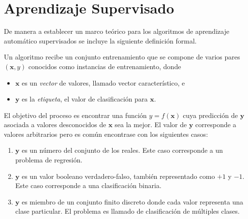 \section{Aprendizaje Supervisado}

\label{sec3:aprendizaje}De manera a establecer un marco teórico para los algoritmos de aprendizaje automático supervisados \cite{Rajaraman2011} se incluye la siguiente definición formal.

\begin{definition}\label{def3:clasificacion}Un algoritmo  recibe un conjunto entrenamiento que se compone de varios pares $(\boldsymbol{x},y)$ conocidos como instancias de entrenamiento, donde
\begin{itemize}
\item $\boldsymbol{x}$ es un \emph{vector} de valores, llamado vector característico, e
\item $\boldsymbol{y}$ es la \emph{etiqueta}, el valor de clasificación para $\boldsymbol{x}$.
\end{itemize}
El objetivo del proceso  es encontrar una función $y=f(\boldsymbol{x})$ cuya predicción de $\boldsymbol{y}$ asociada a valores desconocidos de $\boldsymbol{x}$ sea la mejor. El valor de $\boldsymbol{y}$ corresponde a valores arbitrarios pero es común encontrase con los siguientes casos:
\begin{enumerate}
\item $\boldsymbol{y}$ es un número del conjunto de los reales. Este caso corresponde a un problema de regresión.
\item $\boldsymbol{y}$ es un valor booleano verdadero-falso, también representado como $+1$ y $-1$. Este caso corresponde a una clasificación binaria. 
\item $\boldsymbol{y}$ es miembro de un conjunto finito discreto donde cada valor representa una clase particular. El problema es llamado de clasificación de múltiples clases.
\end{enumerate}
\end{definition}

